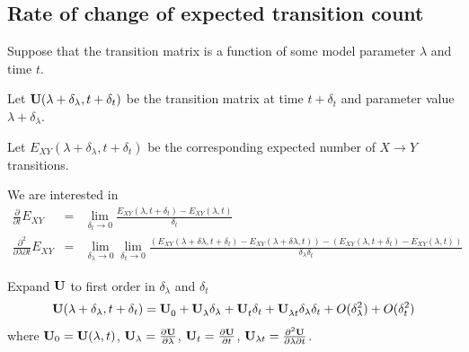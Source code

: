 \documentclass{article}
\begin{document}
\subsection{Rate of change of expected transition count}

Suppose that the transition matrix is a function of some model parameter $\lambda$ and time $t$.

Let ${\bf U}(\lambda+\delta_\lambda,t+\delta_t)$ be the transition matrix at time $t+\delta_t$ and parameter value $\lambda+\delta_\lambda$.

Let $E_{XY}(\lambda+\delta_\lambda,t+\delta_t)$ be the corresponding expected number of $X \to Y$ transitions.

We are interested in
\begin{eqnarray*}
\frac{\partial}{\partial t}E_{XY} & = & \lim_{\delta_t \to 0} \frac{E_{XY}(\lambda,t+\delta_t) - E_{XY}(\lambda,t)}{\delta_t} \\
\frac{\partial^2}{\partial \lambda \partial t}E_{XY} & = & \lim_{\delta_\lambda \to 0} \lim_{\delta_t \to 0}
\frac{\left(E_{XY}(\lambda+\delta \lambda,t+\delta_t) - E_{XY}(\lambda+\delta \lambda,t)\right) - \left(E_{XY}(\lambda,t+\delta_t) - E_{XY}(\lambda,t)\right)}{\delta_\lambda \delta_t}
\end{eqnarray*}

Expand ${\bf U}$ to first order in $\delta_\lambda$ and $\delta_t$
\newcommand\tlambdaexpansion[2]{  {#2}_0^{#1}
  + {#2}_\lambda^{#1} \delta_\lambda
  + {#2}_t^{#1} \delta_t
  + {#2}_{\lambda t}^{#1} \delta_\lambda \delta_t }
\newcommand\uexpansion{\tlambdaexpansion{}{\bf U}}
\newcommand\vexpansion[1]{\tlambdaexpansion{#1}{\bf V}}
\[
  {\bf U}(\lambda+\delta_\lambda,t+\delta_t) = \uexpansion + O(\delta_\lambda^2) + O(\delta_t^2)
\]
where ${\bf U}_0={\bf U}(\lambda,t)$,
${\bf U}_\lambda=\frac{\partial {\bf U}}{\partial \lambda}$,
${\bf U}_t=\frac{\partial {\bf U}}{\partial t}$,
${\bf U}_{\lambda t}=\frac{\partial^2 {\bf U}}{\partial \lambda \partial t}$.
\end{document}
